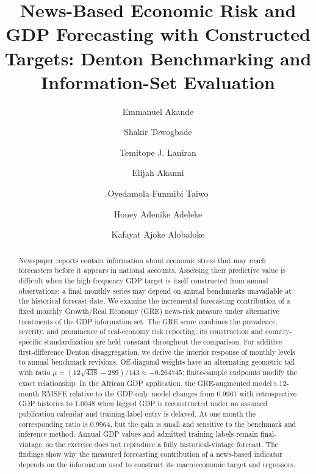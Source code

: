 \documentclass[preprint,12pt,authoryear]{elsarticle}
\begin{document}
\begin{frontmatter}

\title{News-Based Economic Risk and GDP Forecasting with Constructed Targets:
Denton Benchmarking and Information-Set Evaluation}
\author[caperc]{Emmanuel Akande}
\author[caperc]{Shakir Tewogbade}
\author[cbn]{Temitope J. Laniran}
\author[cbn]{Elijah Akanni}
\author[caperc]{Oyedamola Funmibi Taiwo}
\author[ui]{Honey Adenike Adeleke}
\author[ui]{Kafayat Ajoke Alobaloke}

\address[caperc]{CAPE Economic Research and Consulting, 11120 Godwit Ln, Charlotte, NC 28278, USA}
\address[cbn]{Central Bank of Nigeria, Plot 33, Abubakar Tafawa Balewa Way, Central Business District, Abuja, Federal Capital Territory, Nigeria}
\address[ui]{University of Ibadan, Ibadan, Oyo State, Nigeria}


\begin{abstract}
Newspaper reports contain information about economic stress that may reach forecasters before it appears in national accounts. Assessing their predictive value is difficult when the high-frequency GDP target is itself constructed from annual observations: a final monthly series may depend on annual benchmarks unavailable at the historical forecast date. We examine the incremental forecasting contribution of a fixed monthly Growth/Real Economy (GRE) news-risk measure under alternative treatments of the GDP information set. The GRE score combines the prevalence, severity, and prominence of real-economy risk reporting; its construction and country-specific standardization are held constant throughout the comparison. For additive first-difference Denton disaggregation, we derive the interior response of monthly levels to annual benchmark revisions. Off-diagonal weights have an alternating geometric tail with ratio $\mu=(12\sqrt{438}-289)/143\approx-0.264745$; finite-sample endpoints modify the exact relationship. In the African GDP application, the GRE-augmented model's 12-month RMSFE relative to the GDP-only model changes from 0.9961 with retrospective GDP histories to 1.0048 when lagged GDP is reconstructed under an assumed publication calendar and training-label entry is delayed. At one month the corresponding ratio is 0.9964, but the gain is small and sensitive to the benchmark and inference method. Annual GDP values and admitted training labels remain final-vintage, so the exercise does not reproduce a fully historical-vintage forecast. The findings show why the measured forecasting contribution of a news-based indicator depends on the information used to construct its macroeconomic target and regressors.
\end{abstract}


\end{frontmatter}
\end{document}
